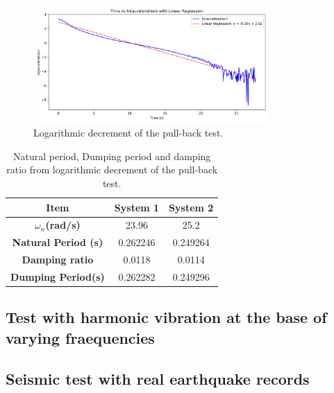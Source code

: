 \documentclass{article}  %
\begin{document}
\begin{figure}[h]
  \centering
  \includegraphics[width=0.8\textwidth]{GRAFICOS/regresion_lineal_second.png}
  \caption{Logarithmic decrement of the pull-back test.}
  \label{fig:pullback2}  
\end{figure}

\begin{table}[h]
\centering
  \begin{tabular}{|c|c|c|}
  \hline
  \textbf{Item}& \textbf{System 1}& \textbf{System 2} \\ \hline
  \textbf{$\omega_n$(rad/s)} & 23.96 & 25.2  \\ \hline
  \textbf{Natural Period (s)} & 0.262246& 0.249264  \\ \hline
  \textbf{Damping ratio} & 0.0118&0.0114  \\ \hline
  \textbf{Dumping Period(s)} & 0.262282&0.249296  \\ \hline
  \end{tabular}
\caption{Natural period, Dumping period and damping ratio from logarithmic decrement of the pull-back test.}
\label{tab:pullback}
\end{table}


\subsection{Test with harmonic vibration at the base of varying fraequencies}

\subsection{Seismic test with real earthquake records}
\end{document}
